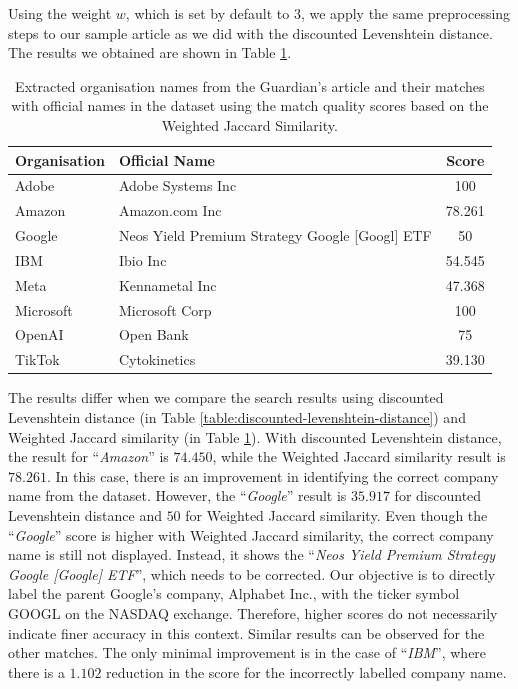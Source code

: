 Using the weight $w$, which is set by default to $3$, we apply the same preprocessing steps to our sample article as we did with the discounted Levenshtein distance. The results we obtained are shown in Table \ref{table:weighted-jaccard-similarity}.

\begin{table}[ht]
    \centering
    \caption{Extracted organisation names from the Guardian's article and their matches with official names in the dataset using the match quality scores based on the Weighted Jaccard Similarity.}
    \label{table:weighted-jaccard-similarity}
    \begin{tabular}{l l c}
        \hline
        Organisation & Official Name & Score \\
        \hline
        Adobe & Adobe Systems Inc & 100 \\
        Amazon & Amazon.com Inc & 78.261 \\
        Google & Neos Yield Premium Strategy Google [Googl] ETF & 50 \\
        IBM & Ibio Inc & 54.545 \\
        Meta & Kennametal Inc & 47.368 \\
        Microsoft & Microsoft Corp & 100 \\
        OpenAI & Open Bank & 75 \\
        TikTok & Cytokinetics & 39.130 \\
        \hline
    \end{tabular}
\end{table}

The results differ when we compare the search results using discounted Levenshtein distance (in Table \ref{table:discounted-levenshtein-distance}) and Weighted Jaccard similarity (in Table \ref{table:weighted-jaccard-similarity}). With discounted Levenshtein distance, the result for ``\textit{Amazon}'' is $74.450$, while the Weighted Jaccard similarity result is $78.261$. In this case, there is an improvement in identifying the correct company name from the dataset. However, the ``\textit{Google}'' result is $35.917$ for discounted Levenshtein distance and $50$ for Weighted Jaccard similarity. Even though the ``\textit{Google}'' score is higher with Weighted Jaccard similarity, the correct company name is still not displayed. Instead, it shows the ``\textit{Neos Yield Premium Strategy Google [Google] ETF}'', which needs to be corrected. Our objective is to directly label the parent Google's company, Alphabet Inc., with the ticker symbol GOOGL on the NASDAQ exchange. Therefore, higher scores do not necessarily indicate finer accuracy in this context. Similar results can be observed for the other matches. The only minimal improvement is in the case of ``\textit{IBM}'', where there is a $1.102$ reduction in the score for the incorrectly labelled company name.

